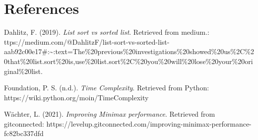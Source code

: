 \documentclass[
]{article}
\begin{document}
\hypertarget{references}{%
\section{References}\label{references}}

Dahlitz, F. (2019). \emph{List sort vs sorted list}. Retrieved from
medium.:
ttps://medium.com/@DahlitzF/list-sort-vs-sorted-list-aab92c00e17\#:\textasciitilde:text=The\%20previous\%20investigations\%20showed\%20us\%2C\%20that\%20list.sort\%20is,use\%20list.sort\%2C\%20you\%20will\%20lose\%20your\%20original\%20list.

Foundation, P. S. (n.d.). \emph{Time Complexity}. Retrieved from Python:
https://wiki.python.org/moin/TimeComplexity

Wächter, L. (2021). \emph{Improving Minimax performance}. Retrieved from
gitconnected:
https://levelup.gitconnected.com/improving-minimax-performance-fc82bc337dfd
\end{document}
